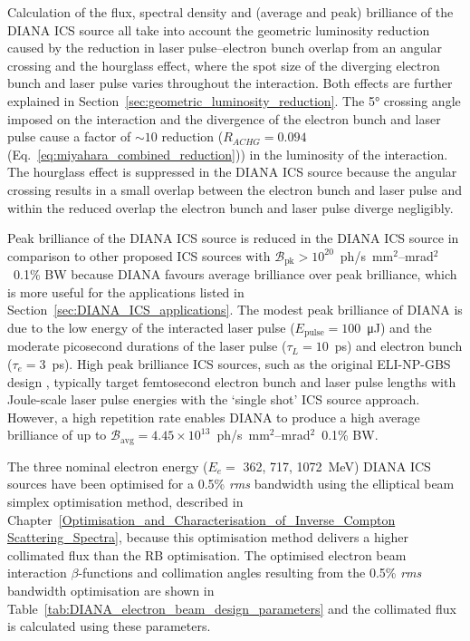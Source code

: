 \documentclass[../main.tex]{subfiles}
\begin{document}
Calculation of the flux, spectral density and (average and peak) brilliance of the DIANA ICS source all take into account the geometric luminosity reduction caused by the reduction in laser pulse--electron bunch overlap from an angular crossing and the hourglass effect, where the spot size of the diverging electron bunch and laser pulse varies throughout the interaction. Both effects are further explained in Section~\ref{sec:geometric_luminosity_reduction}. The 5\si{\degree} crossing angle imposed on the interaction and the divergence of the electron bunch and laser pulse cause a factor of $\sim10$ reduction ($R_{ACHG}=0.094$ (Eq.~\ref{eq:miyahara_combined_reduction})) in the luminosity of the interaction. The hourglass effect is suppressed in the DIANA ICS source because the angular crossing results in a small overlap between the electron bunch and laser pulse and within the reduced overlap the electron bunch and laser pulse diverge negligibly.  

Peak brilliance of the DIANA ICS source is reduced in the DIANA ICS source in comparison to other proposed ICS sources \cite{barty2011overview} with $\mathcal{B}_{\mathrm{pk}}>10^{20}$~ph/\si{\second}~\si{\milli\meter}$^{2}$--\si{\milli\radian}$^{2}$~0.1\% BW because DIANA favours average brilliance over peak brilliance, which is more useful for the applications listed in Section~\ref{sec:DIANA_ICS_applications}. The modest peak brilliance of DIANA is due to the low energy of the interacted laser pulse ($E_{\mathrm{pulse}} = 100$~\si{\micro\joule}) and the moderate picosecond durations of the laser pulse ($\tau_{L}=10$~\si{\pico\second}) and electron bunch ($\tau_{e}=3$~\si{\pico\second}). High peak brilliance ICS sources, such as the original ELI-NP-GBS design \cite{adriani2014technical}, typically target femtosecond electron bunch and laser pulse lengths with Joule-scale laser pulse energies with the `single shot' ICS source approach. However, a high repetition rate enables DIANA to produce a high average brilliance of up to $\mathcal{B}_{\mathrm{avg}}=4.45\times 10^{13}$~ph/\si{\second}~\si{\milli\meter}$^{2}$--\si{\milli\radian}$^{2}$~0.1\% BW. 

The three nominal electron energy ($E_{e}=$ 362, 717, 1072~\si{\mega\electronvolt}) DIANA ICS sources have been optimised for a 0.5\% \textit{rms} bandwidth using the elliptical beam simplex optimisation method, described in Chapter~\ref{Optimisation_and_Characterisation_of_Inverse_Compton Scattering_Spectra}, because this optimisation method delivers a higher collimated flux than the RB optimisation. The optimised electron beam interaction $\beta$-functions and collimation angles resulting from the 0.5\% \textit{rms} bandwidth optimisation are shown in Table~\ref{tab:DIANA_electron_beam_design_parameters} and the collimated flux is calculated using these parameters.
\end{document}
